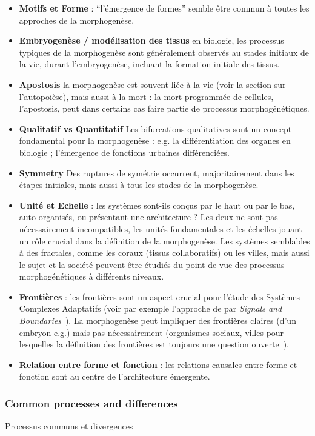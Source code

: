 {\begin{itemize}
\item \textbf{Motifs et Forme} : ``l'émergence de formes'' semble être commun à toutes les approches de la morphogenèse.
\item \textbf{Embryogenèse / modélisation des tissus} en biologie, les processus typiques de la morphogenèse sont généralement observés au stades initiaux de la vie, durant l'embryogenèse, incluant la formation initiale des tissus.
\item \textbf{Apostosis} la morphogenèse est souvent liée à la vie (voir la section sur l'autopoièse), mais aussi à la mort : la mort programmée de cellules, l'apostosis, peut dans certains cas faire partie de processus morphogénétiques.
\item \textbf{Qualitatif vs Quantitatif} Les bifurcations qualitatives sont un concept fondamental pour la morphogenèse : e.g. la différentiation des organes en biologie ; l'émergence de fonctions urbaines différenciées.
\item \textbf{Symmetry} Des ruptures de symétrie occurrent, majoritairement dans les étapes initiales, mais aussi à tous les stades de la morphogenèse.
\item \textbf{Unité et Echelle} : les systèmes sont-ils conçus par le haut ou par le bas, auto-organisés, ou présentant une architecture ? Les deux ne sont pas nécessairement incompatibles, les unités fondamentales et les échelles jouant un rôle crucial dans la définition de la morphogenèse. Les systèmes semblables à des fractales, comme les coraux (tissus collaboratifs) ou les villes, mais aussi le sujet et la société peuvent être étudiés du point de vue des processus morphogénétiques à différents niveaux.
\item \textbf{Frontières} : les frontières sont un aspect crucial pour l'étude des Systèmes Complexes Adaptatifs (voir par exemple l'approche de  par \emph{Signals and Boundaries}~\cite{holland2012signals}). La morphogenèse peut impliquer des frontières claires (d'un embryon e.g.) mais pas nécessairement (organismes sociaux, villes pour lesquelles la définition des frontières est toujours une question ouverte~\cite{2015arXiv150707878C}).
\item \textbf{Relation entre forme et fonction} : les relations causales entre forme et fonction sont au centre de l'architecture émergente.
\end{itemize}
}



\subsubsection*{Common processes and differences}{Processus communs et divergences}

